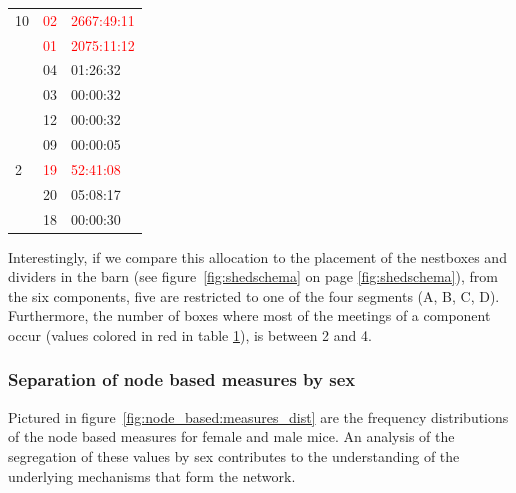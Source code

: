 \begin{table}
\begin{center}
\begin{tabular}{lll}
10	& \textcolor{red}{02}	& \textcolor{red}{2667:49:11} \\
	& \textcolor{red}{01}	& \textcolor{red}{2075:11:12} \\
	& 04	& 01:26:32 \\
	& 03	& 00:00:32 \\
	& 12	& 00:00:32 \\
	& 09	& 00:00:05 \\\hline

2	& \textcolor{red}{19}	& \textcolor{red}{52:41:08} \\
	& 20	& 05:08:17 \\
	& 18	& 00:00:30 \\\hline

\end{tabular}
\label{tab:comp_box_meet_dist}
\end{center}
\end{table} 

Interestingly, if we compare this allocation to the placement of the nestboxes and dividers in the barn (see figure~\ref{fig:shedschema} on page \ref{fig:shedschema}), from the six components, five are restricted to one of the four segments (A, B, C, D). Furthermore, the number of boxes where most of the meetings of a component occur (values colored in red in table \ref{tab:comp_box_meet_dist}), is between 2 and 4. 
 
\subsubsection{Separation of node based measures by sex}
\label{subsubsec:nbm_dist}

Pictured in figure~\ref{fig:node_based:measures_dist} are the frequency distributions of the node based measures for female and male mice. An analysis of the segregation of these values by sex contributes to the understanding of the underlying mechanisms that form the network.

